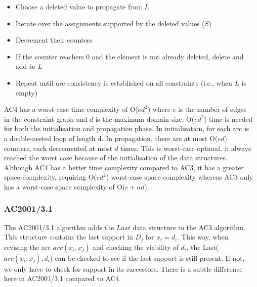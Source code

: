 \documentclass[CS4402-Notes.tex]{subfiles}
\begin{document}
\begin{itemize}
\item Choose a deleted value to propagate from $L$
\item Iterate over the assignments supported by the deleted values ($S$)
\item Decrement their counters
\item If the counter reachers 0 and the element is not already deleted, delete and add to $L$
\item Repeat until arc consistency is established on all constraints (i.e., when $L$ is empty)
\end{itemize}
AC4 has a worst-case time complexity of O($ed^2$) where $e$ is the number of edges in the constraint graph and $d$ is the maximum domain size. O($ed^2$) time is needed for both the initialisation and propagation phase. In initialisation, for each arc is a double-nested loop of length d. In propagation, there are at most O($ed$) counters, each decremented at most $d$ times. This is worst-case optimal, it always reached the worst case because of the initialisation of the data structures. 
\n
Although AC4 has a better time complexity compared to AC3, it has a greater space complexity, requiring O($ed^2$) worst-case space complexity whereas AC3 only has a worst-case space complexity of O($e + nd$).

\subsubsection{AC2001/3.1}
The AC2001/3.1 algorithm adds the $Last$ data structure to the AC3 algorithm. This structure contains the last support in $D_j$ for $x_i = d_i$. This way, when revising the arc $arc(x_i, x_j)$ and checking the viability of $d_i$, the Last($arc(x_i, x_j), d_i$) can be checked to see if the last support is still present. If not, we only have to check for support in its successors.
\n
There is a subtle difference here in AC2001/3.1 compared to AC4. 
\end{document}
